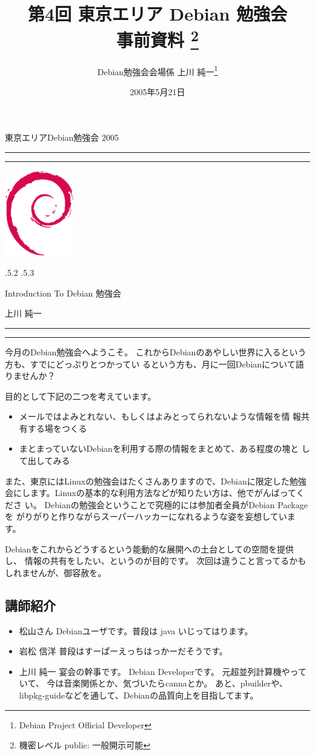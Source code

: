 \documentclass[mingoth]{jsarticle}
\makeatletter
\renewcommand{\section}{\@startsection{section}{1}{\z@}%
    {\Cvs \@plus.5\Cdp \@minus.2\Cdp}%
    {.5\Cvs \@plus.3\Cdp}%
    {\normalfont\Large\headfont\raggedright\centering}} %
\newcommand{\dancersection}[2]{%
\newpage
東京エリアDebian勉強会 2005
\hrule
\vspace{0.5mm}
\hrule
\hfill{}\includegraphics[width=3cm]{image200502/openlogo-nd.eps}\\
\vspace{-4cm}
\begin{center}
  \section{#1}
\end{center}
\hfill{}#2\hspace{3cm}\space\\
\hrule
\hrule
\vspace{1cm}
}
\makeatother
\begin{document}
\begin{titlepage}

\title{
 第4回 東京エリア Debian 勉強会\\事前資料
\footnote{機密レベル public: 一般開示可能}}
\date{2005年5月21日}
\author{Debian勉強会会場係 上川 純一\thanks{Debian Project Official Developer}} 
\maketitle

\end{titlepage}

\newpage
\tableofcontents

\dancersection{Introduction To Debian 勉強会}{上川 純一}

今月のDebian勉強会へようこそ。
これからDebianのあやしい世界に入るという方も、すでにどっぷりとつかってい
るという方も、月に一回Debianについて語りませんか？

目的として下記の二つを考えています。

\begin{itemize}
 \item メールではよみとれない、もしくはよみとってられないような情報を情
       報共有する場をつくる
 \item まとまっていないDebianを利用する際の情報をまとめて、ある程度の塊と
       して出してみる
\end{itemize}

また、東京にはLinuxの勉強会はたくさんありますので、Debianに限定した勉強
会にします。Linuxの基本的な利用方法などが知りたい方は、他でがんばってくださ
い。
Debianの勉強会ということで究極的には参加者全員がDebian Packageを
がりがりと作りながらスーパーハッカーになれるような姿を妄想しています。

Debianをこれからどうするという能動的な展開への土台としての空間を提供し、
情報の共有をしたい、というのが目的です。
次回は違うこと言ってるかもしれませんが、御容赦を。

\subsection{講師紹介}

\begin{itemize}
 \item{松山さん} Debianユーザです。普段は java いじってはります。
 \item{岩松 信洋} 普段はすーぱーえっちはっかーだそうです。
 \item{上川 純一} 宴会の幹事です。
      Debian Developerです。
      元超並列計算機やっていて、
      今は音楽関係とか、気づいたらcannaとか。
      あと、pbuilderや、libpkg-guideなどを通して、Debianの品質向上を目指してます。
\end{itemize}
\end{document}
